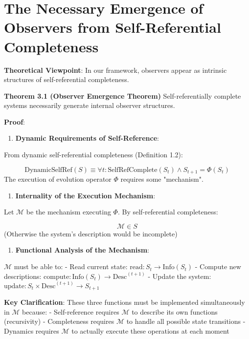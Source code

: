 
\section{The Necessary Emergence of Observers from Self-Referential Completeness}
\label{sec:ch03_quantum:the-necessary-emergence-of-observers-from-self-referential-completeness}

\textbf{Theoretical Viewpoint}: In our framework, observers appear as intrinsic structures of self-referential completeness.

\textbf{Theorem 3.1 (Observer Emergence Theorem)}
\label{thm:3.1}
Self-referentially complete systems necessarily generate internal observer structures.

\textbf{Proof}:

\begin{enumerate}
\item \textbf{Dynamic Requirements of Self-Reference}:
\end{enumerate}
   From dynamic self-referential completeness (Definition 1.2):
   
\begin{equation}
\text{DynamicSelfRef}(S) \equiv \forall t: \text{SelfRefComplete}(S_t) \land S_{t+1} = \Phi(S_t)
\end{equation}
   The execution of evolution operator $\Phi$ requires some "mechanism".
   
\begin{enumerate}
\item \textbf{Internality of the Execution Mechanism}:
\end{enumerate}
   Let $\mathcal{M}$ be the mechanism executing $\Phi$. By self-referential completeness:
   
\begin{equation}
\mathcal{M} \in S
\end{equation}
   (Otherwise the system's description would be incomplete)
   
\begin{enumerate}
\item \textbf{Functional Analysis of the Mechanism}:
\end{enumerate}
   $\mathcal{M}$ must be able to:
   - Read current state: $\text{read}: S_t \to \text{Info}(S_t)$
   - Compute new descriptions: $\text{compute}: \text{Info}(S_t) \to \text{Desc}^{(t+1)}$
   - Update the system: $\text{update}: S_t \times \text{Desc}^{(t+1)} \to S_{t+1}$
   
   \textbf{Key Clarification}: These three functions must be implemented simultaneously in $\mathcal{M}$ because:
   - Self-reference requires $\mathcal{M}$ to describe its own functions (recursivity)
   - Completeness requires $\mathcal{M}$ to handle all possible state transitions
   - Dynamics requires $\mathcal{M}$ to actually execute these operations at each moment
   
